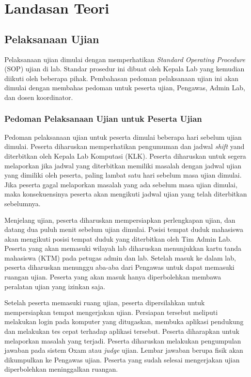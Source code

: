 \chapter{Landasan Teori}
\label{chap:teori}

\section{Pelaksanaan Ujian}
    Pelaksanaan ujian dimulai dengan memperhatikan \textit{Standard Operating Procedure} 
    (SOP) ujian
    di lab\cite{lab:buku-sop}. Standar prosedur ini dibuat oleh Kepala Lab yang
    kemudian diikuti oleh beberapa pihak. Pembahasan pedoman pelaksanaan ujian
    ini akan dimulai dengan membahas pedoman untuk peserta ujian, Pengawas,
    Admin Lab, dan dosen koordinator.
    
\subsection{Pedoman Pelaksanaan Ujian untuk Peserta Ujian}
    Pedoman pelaksanaan ujian untuk peserta dimulai beberapa hari sebelum ujian
    dimulai. Peserta diharuskan memperhatikan pengumuman dan jadwal
    \textit{shift} yand diterbitkan oleh Kepala Lab Komputasi (KLK). Peserta
    diharuskan untuk segera melaporkan jika jadwal yang diterbitkan memiliki
    masalah dengan jadwal ujian yang dimiliki oleh peserta, paling lambat satu
    hari sebelum masa ujian dimulai. Jika peserta gagal melaporkan masalah yang
    ada sebelum masa ujian dimulai, maka konsekuensinya peserta akan mengikuti
    jadwal ujian yang telah diterbitkan sebelumnya.

    Menjelang ujian, peserta diharuskan mempersiapkan perlengkapan ujian, dan
    datang dua puluh menit sebelum ujian dimulai. Posisi tempat duduk mahasiswa
    akan mengikuti posisi tempat duduk yang diterbitkan oleh Tim Admin Lab.
    Peserta yang akan memasuki wilayah lab diharuskan menunjukkan kartu tanda
    mahasiswa (KTM) pada petugas admin dan lab. Setelah masuk ke dalam lab,
    peserta diharuskan menunggu aba-aba dari Pengawas untuk dapat memasuki
    ruangan ujian. Peserta yang akan masuk hanya diperbolehkan membawa peralatan
    ujian yang izinkan saja.

    Setelah peserta memasuki ruang ujian, peserta dipersilahkan untuk mempersiapkan
    tempat mengerjakan ujian. Persiapan tersebut meliputi melakukan login pada
    komputer yang ditugaskan, membuka aplikasi pendukung dan melakukan tes
    cepat terhadap aplikasi tersebut. Peserta diharapkan untuk melaporkan
    masalah yang terjadi. Peserta diharuskan melakukan pengumpulan jawaban pada
    sistem Oxam atau \textit{judge} ujian. Lembar jawaban berupa fisik akan
    dikumpulkan ke Pengawas ujian. Peserta yang sudah selesai mengerjakan ujian
    diperbolehkan meninggalkan ruangan.

